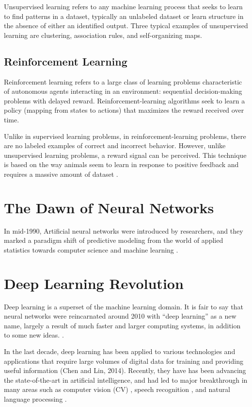 Unsupervised learning \cite{sammut2011encyclopedia} refers to any machine learning process that seeks to learn to find patterns in a dataset, typically an unlabeled dataset or learn structure in the absence of either an identified output. Three typical examples of unsupervised learning are clustering,  association rules, and self-organizing maps.

\subsection*{Reinforcement Learning}

Reinforcement learning \cite{sammut2011encyclopedia} refers to a large class of learning problems characteristic of autonomous agents interacting in an environment: sequential decision-making problems with delayed reward. Reinforcement-learning algorithms seek to learn a policy (mapping from states to actions) that maximizes the reward received over time.

Unlike in supervised learning problems, in reinforcement-learning problems, there are no labeled examples of correct and incorrect behavior. However, unlike unsupervised learning problems, a reward signal can be perceived. This technique is based on the way animals seem to learn in response to positive feedback and requires a massive amount of dataset \cite{sammut2011encyclopedia}.

\section{The Dawn of Neural Networks}
In mid-1990, Artificial neural networks were introduced by researchers, and they marked a paradigm shift of predictive modeling from the world of applied statistics towards computer science and machine learning \cite{efron2016computer}.

\section{Deep Learning Revolution}

Deep learning is a superset of the machine learning domain. It is fair to say that neural networks were reincarnated around 2010 with “deep learning” as a new name, largely a result of much faster and larger computing systems, in addition to some new ideas. \cite{efron2016computer}.


In the last decade, deep learning has been applied to various technologies and applications that require large volumes of digital data for training and providing useful information (Chen and Lin, 2014). Recently, they have has been advancing the state-of-the-art in artificial intelligence, and had led to major breakthrough in many areas such as computer vision (CV) \cite{krizhevsky2012imagenet} \cite{karpathy2014large}, speech recognition \cite{graves2013speech} \cite{mohamed2012acoustic}, and natural language processing \cite{bengio2003neural} \cite{mikolov2013distributed} \cite{mikolov2010recurrent}.

